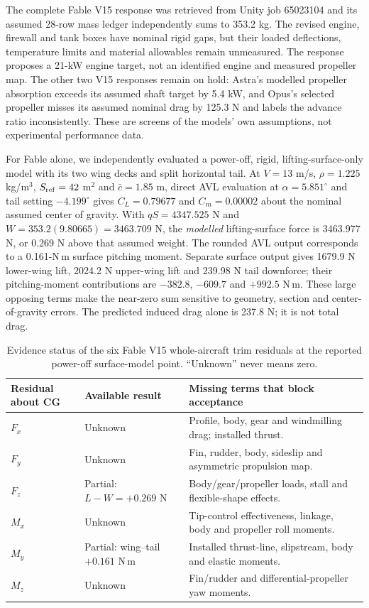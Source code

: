 \documentclass[10pt,letterpaper]{article}
\begin{document}
The complete Fable V15 response was retrieved from Unity job 65023104 and
its assumed 28-row mass ledger independently sums to 353.2 kg. The revised
engine, firewall and tank boxes have nominal rigid gaps, but their loaded
deflections, temperature limits and material allowables remain unmeasured.
The response proposes a 21-kW engine target, not an identified engine and
measured propeller map. The other two V15 responses remain on hold: Astra's
modelled propeller absorption exceeds its assumed shaft target by 5.4 kW,
and Opus's selected propeller misses its assumed nominal drag by 125.3 N
and labels the advance ratio inconsistently. These are screens of the
models' own assumptions, not experimental performance data.

For Fable alone, we independently evaluated a power-off, rigid,
lifting-surface-only model with its two wing decks and split horizontal
tail. At $V=13$ m/s, $\rho=1.225$ kg/m$^3$, $S_{\rm ref}=42$ m$^2$ and
$\bar c=1.85$ m, direct AVL evaluation at $\alpha=5.851^\circ$ and tail
setting $-4.199^\circ$ gives $C_L=0.79677$ and $C_m=0.00002$ about the
nominal assumed center of gravity. With $qS=4347.525$ N and
$W=353.2(9.80665)=3463.709$ N, the \emph{modelled} lifting-surface force is
3463.977 N, or 0.269 N above that assumed weight. The rounded AVL output
corresponds to a 0.161-N\,m surface pitching moment. Separate surface
output gives 1679.9 N lower-wing lift, 2024.2 N upper-wing lift and
239.98 N tail downforce; their pitching-moment contributions are
$-382.8$, $-609.7$ and $+992.5$ N\,m. These large opposing terms make
the near-zero sum sensitive to geometry, section and center-of-gravity
errors. The predicted induced drag alone is 237.8 N; it is not total drag.

\begin{table}[p]
\centering\small
\caption{Evidence status of the six Fable V15 whole-aircraft trim residuals at the reported power-off surface-model point. ``Unknown'' never means zero.}
\label{tab:v15-fable-six-axis}
\begin{tabularx}{\linewidth}{@{}p{.16\linewidth}p{.24\linewidth}X@{}}
\toprule
Residual about CG & Available result & Missing terms that block acceptance\\
\midrule
$F_x$ & Unknown & Profile, body, gear and windmilling drag; installed thrust.\\
$F_y$ & Unknown & Fin, rudder, body, sideslip and asymmetric propulsion map.\\
$F_z$ & Partial: $L-W=+0.269$ N & Body/gear/propeller loads, stall and flexible-shape effects.\\
$M_x$ & Unknown & Tip-control effectiveness, linkage, body and propeller roll moments.\\
$M_y$ & Partial: wing--tail $+0.161$ N\,m & Installed thrust-line, slipstream, body and elastic moments.\\
$M_z$ & Unknown & Fin/rudder and differential-propeller yaw moments.\\
\bottomrule
\end{tabularx}
\end{table}
\end{document}
